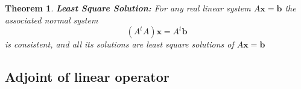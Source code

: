 \documentclass{article}
\newtheorem{theorem}{Theorem}[section]
\numberwithin{theorem}{subsection} %
\begin{document}
\begin{theorem}
    \textbf{Least Square Solution:}
    For any real linear system $A\mathbf{x} = \mathbf{b}$ the associated normal system 
    \begin{equation*}
        (A^tA)\mathbf{x} = A^t \mathbf{b}
    \end{equation*}
is consistent, and all its solutions are least square solutions of $A\mathbf{x} = \mathbf{b}$
\end{theorem}


\subsection{Adjoint of linear operator}
\end{document}
